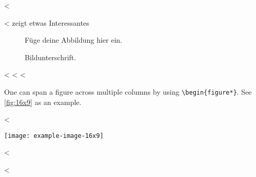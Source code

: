 <%

<%
 zeigt etwas Interessantes

\begin{figure}
  \centering
  Füge deine Abbildung hier ein.
  \caption{Bildunterschrift.}
  \label{fig:label}
\end{figure}
<%
<%
<%

One can span a figure across multiple columns by using \verb+\begin{figure*}+.
See \cref{fig:16x9} as an example.

<%
\begin{figure*}
  \centering
  \texttt{[image: example-image-16x9]}
  \caption{16x9 Figure}
  \label{fig:16x9}
\end{figure*}
<%

<%
